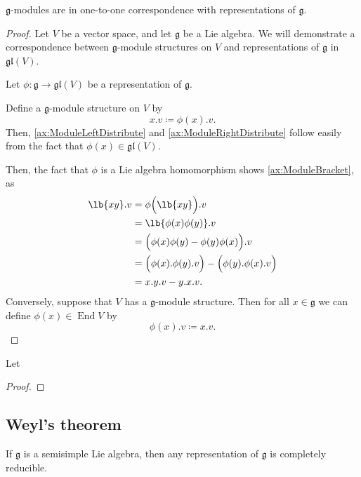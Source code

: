 \documentclass{article}
\DeclarePairedDelimiter\lb\lbrack\rbrack
\DeclareMathOperator{\End}{End}
\newcommand*\frkg{{\ensuremath{\mathfrak{g}}}}
\newcommand*\glalg{\ensuremath{\mathfrak{gl}}}
\newcommand*\acts{.}
\begin{document}
\begin{proposition}
    $\frkg$-modules are in one-to-one correspondence with representations of $\frkg$.
\end{proposition}

\begin{proof}
    Let $V$ be a vector space, and let $\frkg$ be a Lie algebra.
    We will demonstrate a correspondence between $\frkg$-module structures on $V$ and representations of $\frkg$ in $\glalg(V)$.

    Let $\phi: \frkg \to \glalg(V)$ be a representation of $\frkg$.

    Define a $\frkg$-module structure on $V$ by
    \[
        x.v
        \coloneq
        \phi(x) \acts v.
    \]
    Then, \ref{ax:ModuleLeftDistribute} and \ref{ax:ModuleRightDistribute} follow easily from the fact that $\phi(x) \in \glalg(V)$.

    Then, the fact that $\phi$ is a Lie algebra homomorphism shows \ref{ax:ModuleBracket}, as
    \begin{align*}
        \lb{xy}.v
        &=
        \phi\Big(\lb{xy}\Big) \acts v
        \\
        &=
        \lb{\phi(x)\phi(y)} \acts v
        \\
        &=
        \Big(
            \phi(x)\phi(y) - \phi(y)\phi(x)
        \Big)
        \acts v
        \\
        &=
        \Big(
            \phi(x) \acts \phi(y) \acts v
        \Big) 
        -
        \Big(
            \phi(y) \acts \phi(x) \acts v
        \Big) 
        \\
        &=
        x.y.v - y.x.v.
    \end{align*}
    Conversely, suppose that $V$ has a $\frkg$-module structure.
    Then for all $x \in \frkg$ we can define $\phi(x) \in \End V$ by
    \[
        \phi(x) \acts v
        \coloneq
        x.v.
    \]
\end{proof}

\begin{theorem}
    Let
\end{theorem}
\begin{proof}
\end{proof}

\subsection{Weyl's theorem}

\begin{theorem}
    If $\frkg$ is a semisimple Lie algebra, then any representation of $\frkg$ is completely reducible.
\end{theorem}
\end{document}
